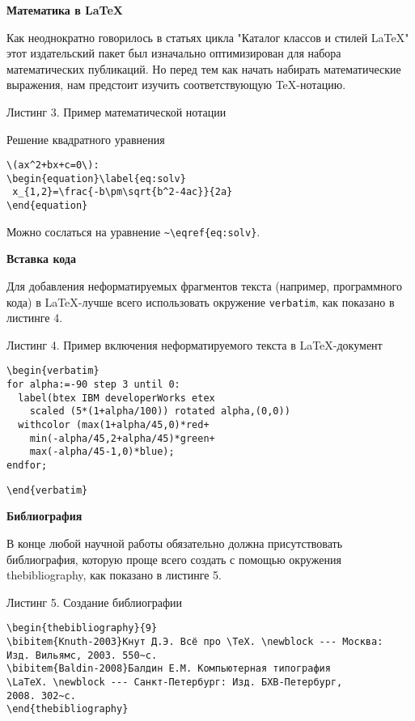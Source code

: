 \textbf{Математика в LaTeX}

Как неоднократно говорилось в статьях цикла "Каталог классов и стилей LaTeX" этот издательский пакет был изначально оптимизирован для набора математических публикаций. Но перед тем как начать набирать математические выражения, нам предстоит изучить соответствующую TeX-нотацию.

Листинг 3. Пример математической нотации

Решение квадратного уравнения 

\begin{verbatim}
\(ax^2+bx+c=0\):
\begin{equation}\label{eq:solv}
 x_{1,2}=\frac{-b\pm\sqrt{b^2-4ac}}{2a}
\end{equation}

\end{verbatim}

Можно сослаться на уравнение \verb|~\eqref{eq:solv}|.

\textbf{Вставка кода}

Для добавления неформатируемых фрагментов текста (например, программного кода) в LaTeX-лучше всего использовать окружение \verb|verbatim|, как показано в листинге 4.

Листинг 4. Пример включения неформатируемого текста в LaTeX-документ

\begin{verbatim}
\begin{verbatim}
for alpha:=-90 step 3 until 0:
  label(btex IBM developerWorks etex
    scaled (5*(1+alpha/100)) rotated alpha,(0,0))
  withcolor (max(1+alpha/45,0)*red+
    min(-alpha/45,2+alpha/45)*green+
    max(-alpha/45-1,0)*blue);
endfor;
\end{verbatim}
\verb|\end{verbatim} |

\textbf{Библиография}

В конце любой научной работы обязательно должна присутствовать библиография, которую проще всего создать с помощью окружения thebibliography, как показано в листинге 5.

Листинг 5. Создание библиографии

\begin{verbatim}
\begin{thebibliography}{9}
\bibitem{Knuth-2003}Кнут Д.Э. Всё про \TeX. \newblock --- Москва:
Изд. Вильямс, 2003. 550~с.
\bibitem{Baldin-2008}Балдин Е.М. Компьютерная типография
\LaTeX. \newblock --- Санкт-Петербург: Изд. БХВ-Петербург,
2008. 302~с.
\end{thebibliography}
\end{verbatim}

